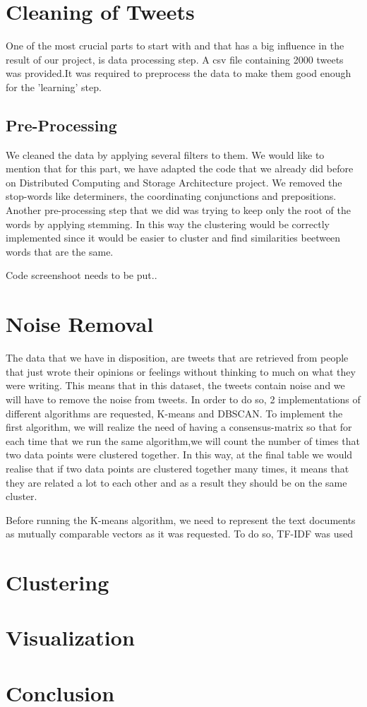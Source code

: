 \documentclass{article}
\begin{document}
        \section{ Cleaning of Tweets }
One of the most crucial parts to start with and that has a big influence in the result of our project, is data processing step. A csv file containing 2000 tweets was provided.It was required to preprocess the data to make them good enough for the 'learning' step.
        
        \subsection{Pre-Processing}

        We cleaned the data by applying several filters to them. We would like to mention that for this part, we have adapted the code that we already did before on Distributed Computing and Storage Architecture project. 
         We removed the stop-words like determiners, the coordinating conjunctions and prepositions. Another pre-processing step that we did was trying to keep only the root of the words by applying stemming. In this way the clustering would be correctly implemented since it would be easier to cluster and find similarities beetween words that are the same. 
         
         Code screenshoot needs to be put..

        \newpage
        \section{Noise Removal}
The data that we have in disposition, are tweets that are retrieved from people that just wrote their opinions or feelings without thinking to much on what they were writing. This means that in this dataset, the tweets contain noise and we will have to remove the noise from tweets. In order to do so, 2 implementations of different algorithms are requested, K-means and DBSCAN. 
To implement the first algorithm, we will realize the need of having a consensus-matrix so that for each time that we run the same algorithm,we will count the number of times that two data points were clustered together. In this way, at the final table we would realise that if two data points are clustered together many times, it means that they are related a lot to each other and as a result they should be on the same cluster.

Before running the K-means algorithm, we need to represent the text documents as mutually comparable vectors as it was requested. To do so, TF-IDF was used

        \section{Clustering}


        \section{Visualization}

    
        \section{Conclusion}



      
    
    
    \nocite{*}
\end{document}

